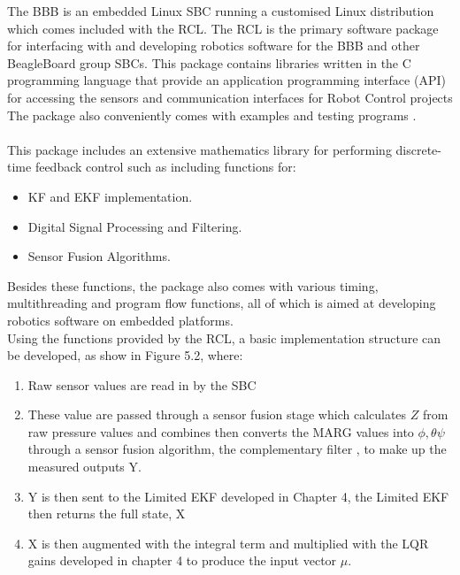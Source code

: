 \documentclass[12pt,a4paper,twoside]{report}
\begin{document}
				The BBB is an embedded Linux SBC running a customised Linux distribution which comes included with the RCL. The RCL is the primary software package for interfacing with and developing robotics software for the BBB and other BeagleBoard group SBCs. This package contains libraries written in the C programming language that provide an application programming interface (API) for accessing the sensors and communication interfaces for Robot Control projects \cite{31} The package also conveniently comes with examples and testing programs . 
				\\ \\
				This package includes an extensive mathematics library for performing discrete-time feedback control such as including functions for:
				
				\begin{itemize}
					\item
						KF and EKF implementation.
					\item
						Digital Signal Processing and Filtering.
					\item
						Sensor Fusion Algorithms.
				\end{itemize}  
		
				Besides these functions, the package also comes with various timing, multithreading and program flow functions, all of which is aimed at developing robotics software on embedded platforms.
				\\
				Using the functions provided by the RCL, a basic implementation structure can be developed, as show in Figure 5.2, where:
				\\
				\begin{enumerate}
					\item 
						Raw sensor values are read in by the SBC
					\item 
						These value are passed through a sensor fusion stage which calculates $Z$ from raw pressure values and combines then converts the MARG values into $\phi,\theta\psi$ through a sensor fusion algorithm, the complementary filter \cite{20}, to make up the measured outputs Y.
					\item 
						Y is then sent to the Limited EKF developed in Chapter 4, the Limited EKF then returns the full state, X
					\item 
						X is then augmented with the integral term and multiplied with the LQR gains developed in chapter 4 to produce the input vector $\mu$.
				\end{enumerate}
			
\end{document}
